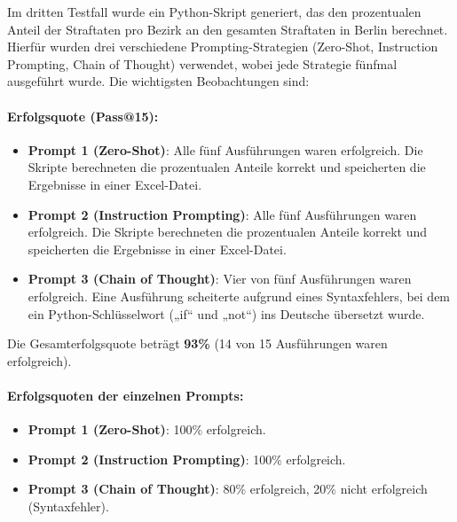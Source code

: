 \documentclass[11pt,a4paper]{article}
\begin{document}
Im dritten Testfall wurde ein Python-Skript generiert, das den prozentualen Anteil der Straftaten pro Bezirk an den gesamten Straftaten in Berlin berechnet. Hierfür wurden drei verschiedene Prompting-Strategien (Zero-Shot, Instruction Prompting, Chain of Thought) verwendet, wobei jede Strategie fünfmal ausgeführt wurde. Die wichtigsten Beobachtungen sind:

\paragraph{Erfolgsquote (Pass@15):}
\begin{itemize}
    \item \textbf{Prompt 1 (Zero-Shot)}: Alle fünf Ausführungen waren erfolgreich. Die Skripte berechneten die prozentualen Anteile korrekt und speicherten die Ergebnisse in einer Excel-Datei.
    \item \textbf{Prompt 2 (Instruction Prompting)}: Alle fünf Ausführungen waren erfolgreich. Die Skripte berechneten die prozentualen Anteile korrekt und speicherten die Ergebnisse in einer Excel-Datei.
    \item \textbf{Prompt 3 (Chain of Thought)}: Vier von fünf Ausführungen waren erfolgreich. Eine Ausführung scheiterte aufgrund eines Syntaxfehlers, bei dem ein Python-Schlüsselwort („if“ und „not“) ins Deutsche übersetzt wurde.
\end{itemize}
Die Gesamterfolgsquote beträgt \textbf{93\%} (14 von 15 Ausführungen waren erfolgreich).
\paragraph{Erfolgsquoten der einzelnen Prompts:}
\begin{itemize}
    \item \textbf{Prompt 1 (Zero-Shot)}: 100\% erfolgreich.
    \item \textbf{Prompt 2 (Instruction Prompting)}: 100\% erfolgreich.
    \item \textbf{Prompt 3 (Chain of Thought)}: 80\% erfolgreich, 20\% nicht erfolgreich (Syntaxfehler).
\end{itemize}
\end{document}
